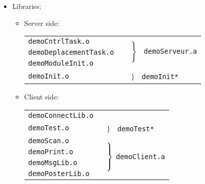 \begin{itemize}

\item Libraries:

	\begin{itemize}
	\item Server side:

		\vspace{.3cm}
		{\small
		\begin{tabular}{ll}
		\cline{1-1}
		\tt demoCntrlTask.o &
			\multirow{3}{3.5cm}{\
			$\left.{\vrule width 0pt height .6cm} \right\}$ \
			\tt demoServeur.a} \\
		\tt demoDeplacementTask.o \\
		\tt demoModuleInit.o	\\
		\cline{1-1}
		\tt demoInit.o		
		    & 	\multirow{1}{3.5cm}{\
		      	$\left.{\vrule width 0pt} \right\}$
		      	\tt ~demoInit*}  \\
		\cline{1-1}
		\end{tabular}
		}
		\vspace{.3cm}

	\item Client side:

		\vspace{.3cm}
		{\small
		\begin{tabular}{ll}
		\cline{1-1}
		\tt demoConnectLib.o \\
		\cline{1-1}
		\tt demoTest.o 
		    & 	\multirow{1}{3.5cm}{
		      	$\left.{\vrule width 0pt} \right\}$
		      	\tt ~demoTest*}  \\
		\cline{1-1}
		\tt demoScan.o	
		    &	\multirow{4}{3.5cm}{
			$\left.{\vrule width 0pt height .8cm} \right\}$
			\tt demoClient.a}\\
		\tt demoPrint.o		\\
		\tt demoMsgLib.o	\\
		\tt demoPosterLib.o	\\
		\cline{1-1}
		\end{tabular}
		}
	\end{itemize}

\end{itemize}
